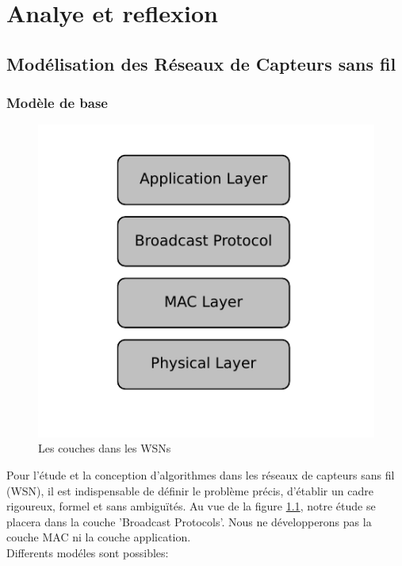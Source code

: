 
\chapter{Analye et reflexion}\label{Analyse_et_reflexion}

\section{Modélisation des Réseaux de Capteurs sans fil}

\subsection{Modèle de base}

\begin{figure}[h]
\centering
\includegraphics[scale=0.9]{Etat_de_l'art/source/layer.pdf}
\caption{\label{Layer} Les couches dans les WSNs}
\end{figure}

Pour l'étude et la conception d'algorithmes dans les réseaux de capteurs sans fil (WSN), il est indispensable de définir le problème précis, d'établir un cadre rigoureux, formel et sans ambiguïtés. Au vue de la figure \ref{Layer}, 
notre étude se placera dans la couche 'Broadcast Protocols'. Nous ne développerons pas la couche MAC ni la couche application.\\
Differents modéles sont possibles:\\

